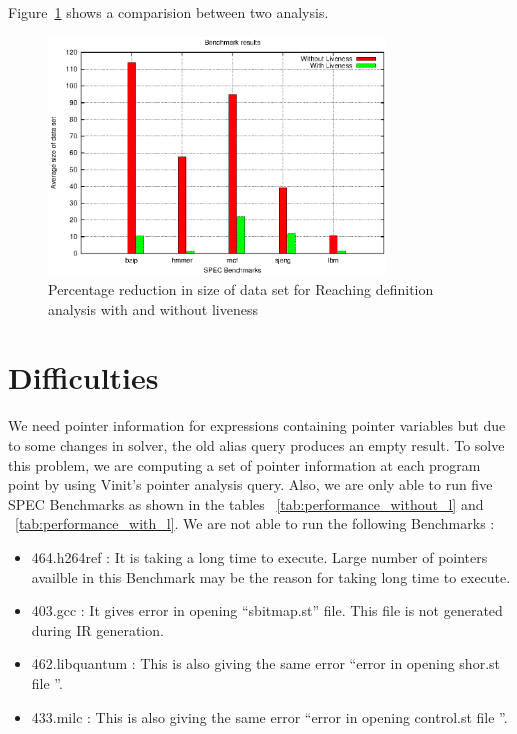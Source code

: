 \documentclass[11pt,a4paper,openright]{report}
\begin{document}
Figure~\ref{fig:bench_mark} shows a comparision between two analysis.
\begin{figure}[H]
\centering
\includegraphics[width=0.8\textwidth]{graph_new.eps}
\caption{Percentage reduction in size of data set for Reaching definition analysis with and without liveness}
\label{fig:bench_mark}
\end{figure}


\section*{Difficulties}

We need pointer information for expressions containing pointer variables but due to some changes in solver, the old alias query produces an empty result.
To solve this problem, we are computing a set of pointer information at each program point by using Vinit's pointer analysis query. Also, we are only able to run 
five SPEC Benchmarks as shown in the tables ~\ref{tab:performance_without_l} and ~\ref{tab:performance_with_l}. 
We are not able to run the following Benchmarks :
\begin{itemize}
 \item 464.h264ref : It is taking a long time to execute. Large number of pointers availble in this Benchmark may be the reason for taking long time to execute.
 \item 403.gcc : It gives error in opening ``sbitmap.st'' file. This file is not generated during IR generation.
 \item 462.libquantum : This is also giving the same error ``error in opening shor.st file ''.
 \item 433.milc : This is also giving the same error ``error in opening control.st file ''.

\end{itemize}





\end{document}
